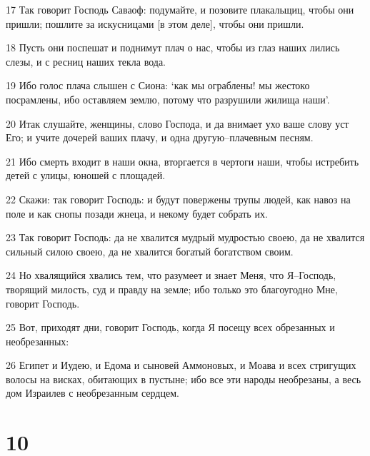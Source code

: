 \par 17 Так говорит Господь Саваоф: подумайте, и позовите плакальщиц, чтобы они пришли; пошлите за искусницами [в этом деле], чтобы они пришли.
\par 18 Пусть они поспешат и поднимут плач о нас, чтобы из глаз наших лились слезы, и с ресниц наших текла вода.
\par 19 Ибо голос плача слышен с Сиона: `как мы ограблены! мы жестоко посрамлены, ибо оставляем землю, потому что разрушили жилища наши'.
\par 20 Итак слушайте, женщины, слово Господа, и да внимает ухо ваше слову уст Его; и учите дочерей ваших плачу, и одна другую--плачевным песням.
\par 21 Ибо смерть входит в наши окна, вторгается в чертоги наши, чтобы истребить детей с улицы, юношей с площадей.
\par 22 Скажи: так говорит Господь: и будут повержены трупы людей, как навоз на поле и как снопы позади жнеца, и некому будет собрать их.
\par 23 Так говорит Господь: да не хвалится мудрый мудростью своею, да не хвалится сильный силою своею, да не хвалится богатый богатством своим.
\par 24 Но хвалящийся хвались тем, что разумеет и знает Меня, что Я--Господь, творящий милость, суд и правду на земле; ибо только это благоугодно Мне, говорит Господь.
\par 25 Вот, приходят дни, говорит Господь, когда Я посещу всех обрезанных и необрезанных:
\par 26 Египет и Иудею, и Едома и сыновей Аммоновых, и Моава и всех стригущих волосы на висках, обитающих в пустыне; ибо все эти народы необрезаны, а весь дом Израилев с необрезанным сердцем.

\chapter{10}

